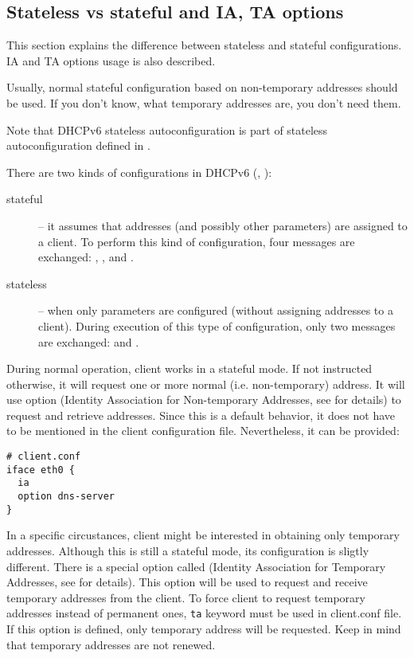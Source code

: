 \begin{enumerate}
\subsection{Stateless vs stateful and IA, TA options}
\label{feature-stateless-stateful}
This section explains the difference between stateless and stateful
configurations. IA and TA options usage is also described.

Usually, normal stateful configuration based on non-temporary
addresses should be used. If you don't know, what temporary addresses
are, you don't need them.

Note that DHCPv6 stateless autoconfiguration is part of stateless autoconfiguration
defined in \cite{rfc4862}.

There are two kinds of configurations in DHCPv6 (\cite{rfc3315},
\cite{rfc3736}):
\begin{description}
  \item[stateful] -- it assumes that addresses (and possibly other
    parameters) are assigned to a client. To perform this kind of
    configuration, four messages are exchanged: ,
    ,  and .
  \item[stateless] -- when only parameters are configured (without
    assigning addresses to a client). During execution of this type of
    configuration, only two messages are exchanged: 
    and .
\end{description}

During normal operation, client works in a stateful mode. If not
instructed otherwise, it will request one or more normal
(i.e. non-temporary) address. It will use  option (Identity
Association for Non-temporary Addresses, see \cite{rfc3315} for
details) to request and retrieve addresses. Since this is a default
behavior, it does not have to be mentioned in the client configuration
file. Nevertheless, it can be provided:

\begin{lstlisting}
# client.conf
iface eth0 {
  ia
  option dns-server
}
\end{lstlisting}

In a specific circustances, client might be interested in obtaining
only temporary addresses. Although this is still a stateful mode, its
configuration is sligtly different. There is a special option called
 (Identity Association for Temporary Addresses, see
\cite{rfc3315} for details). This option will be used to request and
receive temporary addresses from the client. To force client to
request temporary addresses instead of permanent ones, \verb+ta+
keyword must be used in client.conf file. If this option is defined,
only temporary address will be requested. Keep in mind that temporary
addresses are not renewed.


\end{enumerate}
